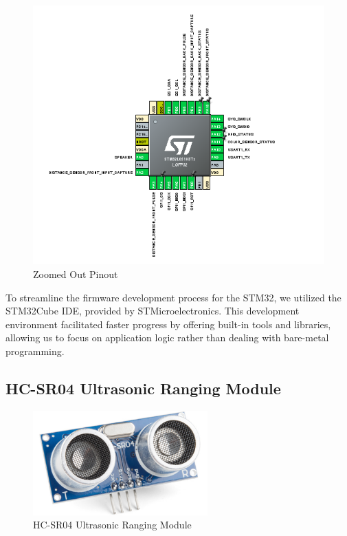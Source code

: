 \documentclass{article}
\begin{document}
\begin{figure}[H]
\begin{minipage}[b]{0.48\textwidth}
        \includegraphics[width=\textwidth, height=0.4\textheight, keepaspectratio]{Figures/stm32_pinout_out.png}
        \caption{Zoomed Out Pinout}
        \label{fig:stm32_pinout_zoomed_out}
    \end{minipage}
\end{figure}

To streamline the firmware development process for the STM32, we utilized the STM32Cube IDE, provided by STMicroelectronics. This development environment facilitated faster progress by offering built-in tools and libraries, allowing us to focus on application logic rather than dealing with bare-metal programming.



\subsection{HC-SR04 Ultrasonic Ranging Module}
\label{sec:distancesensor}

\begin{figure}[H]
    \centering
    \includegraphics[width=0.6\textwidth]{Figures/distancesensor.png} %
    \caption{HC-SR04 Ultrasonic Ranging Module}
    \label{fig:distancesensor}
\end{figure}
\end{document}
